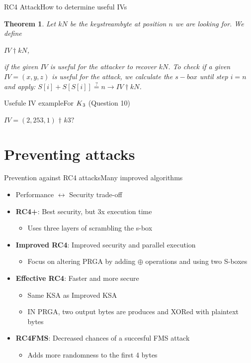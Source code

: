 \documentclass[
	aspectratio=169,	%
	onlytextwidth,		%
	t					%
	]{beamer}
\newtheorem{thm}{Theorem}
\begin{document}
\begin{frame}[fragile]{RC4 Attack}{How to determine useful IVs}
	\begin{thm}
		Let $kN$ be the keystreambyte at position $n$ we are looking for. We define\\
		\begin{center}$IV \dagger kN$,
		\end{center}
		if the given $IV$ is useful for the attacker to recover $kN$.
		To check if a given $IV=(x,y,z)$ is useful for the attack, we calculate the $s-box$ until step $i=n$ and apply:
		$S[i] + S[S[i]] \stackrel{?}{=} n \rightarrow IV \dagger kN$.
	\end{thm} 
\end{frame}

\begin{frame}[fragile]{Usefule IV example}{For $K\textsubscript{3}$ (Question 10)}
	\begin{itemize}
		$IV=(2,253,1)$ $\dagger$ $k3?$ 
	\end{itemize}
\end{frame}

\section{Preventing attacks}

\begin{frame}[fragile]{Prevention against RC4 attacks}{Many improved algorithms}
	\begin{itemize}
		\item Performance $\leftrightarrow$ Security trade-off
		\item \textbf{RC4+}: Best security, but 3x execution time
		\begin{itemize}
			\item Uses three layers of scrambling the s-box 
		\end{itemize}
		\item \textbf{Improved RC4}: Improved security and parallel execution
		\begin{itemize}
			\item Focus on altering PRGA by adding $\oplus$ operations and using two S-boxes
		\end{itemize}
		\item \textbf{Effective RC4}: Faster and more secure
		\begin{itemize}
			\item Same KSA as Improved KSA 
			\item IN PRGA, two output bytes are produces and XORed with plaintext bytes
		\end{itemize}
		\item \textbf{RC4FMS}: Decreased chances of a succesful FMS attack
		\begin{itemize}
			\item Adds more randomness to the first 4 bytes 
		\end{itemize}
	\end{itemize}
\end{frame}
\end{document}
